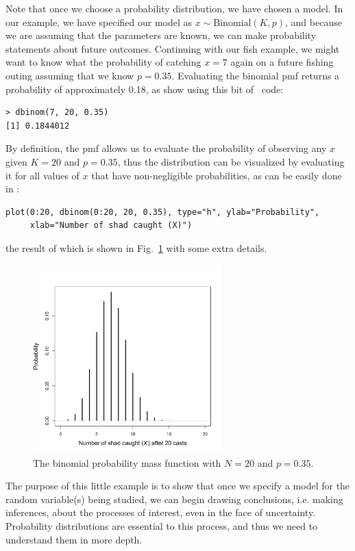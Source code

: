 Note that once we choose a probability distribution, we have chosen a
model. In our example, we have specified our model as $x \sim
\text{Binomial}(K,p)$, and because we are assuming that the parameters are
known, we can make probability statements about future
outcomes. Continuing with our fish example, we might want to know what
the probability of catching $x=7$ again on a future fishing outing
assuming that we know $p=0.35$. Evaluating the binomial pmf returns a
probability of approximately 0.18, as show using this bit of \R~code:
\begin{verbatim}
> dbinom(7, 20, 0.35)
[1] 0.1844012
\end{verbatim}
By definition, the pmf allows us to evaluate the probability of observing
any $x$ given $K=20$ and $p=0.35$, thus the distribution %
can be visualized by evaluating it for all values of $x$ that have
non-negligible probabilities, as can be easily done in \R:
\begin{verbatim}
plot(0:20, dbinom(0:20, 20, 0.35), type="h", ylab="Probability",
     xlab="Number of shad caught (X)")
\end{verbatim}
the result of which is shown in Fig.~\ref{modeling.fig.bin} with some extra details.
\begin{figure}%
  \centering
  \includegraphics[width=0.65\textwidth]{Ch2/figs/bin}
\caption{The binomial probability mass function with $N=20$ and
  $p=0.35$. }
\label{modeling.fig.bin}
\end{figure}

The purpose of this little example is to show that once we specify a
model for the random variable(s) being studied, we can begin drawing
conclusions, i.e. making inferences, about the processes of interest,
even in the face of uncertainty. Probability distributions are
essential to this process, and thus we need to
understand them in more depth.


